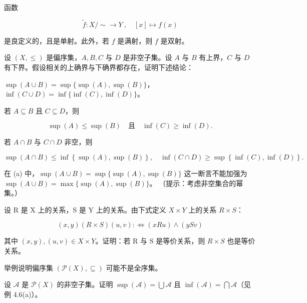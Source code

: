 \begin{exercises}
\begin{items}
\item

函数

\[
\tilde{f}\colon X/{\sim}\to Y~,\quad[x]\mapsto f(x)
\]

是良定义的，且是单射。此外，若 $f$ 是满射，则 $f$ 是双射。

\end{items}

\item

设  $ (X, \leq) $ 是偏序集，$ A, B, C $ 与  $ D $ 是非空子集。设  $ A $ 与  $ B $ 有上界，$ C $ 与  $ D $ 有下界。假设相关的上确界与下确界都存在，证明下述结论：

\begin{items}
\item

$ \sup(A \cup B) = \sup\{\sup(A), \sup(B)\} $，$ \inf(C \cup D) = \inf\{\inf(C), \inf(D)\} $。

\item

若  $ A \subseteq B $ 且  $ C \subseteq D $，则

\[
\sup(A)\leq\sup(B)\quad\text{且}\quad\inf(C)\geq\inf(D).
\]
\item

若  $ A \cap B $ 与  $ C \cap D $ 非空，则

\[
\operatorname*{s u p}(A\cap B)\leq\operatorname*{i n f}\left\{\operatorname*{s u p}(A),\operatorname*{s u p}(B)\right\},\quad\operatorname*{i n f}(C\cap D)\geq\operatorname*{s u p}\left\{\operatorname*{i n f}(C),\operatorname*{i n f}(D)\right\}.
\]
\item

在 (a) 中，$ \sup(A \cup B) = \sup\{\sup(A), \sup(B)\} $ 这一断言不能加强为  $ \sup(A \cup B) = \max\{\sup(A), \sup(B)\} $。
（提示：考虑非空集合的幂集。）

\end{items}

\item

设 R 是 X 上的关系，S 是 Y 上的关系。由下式定义  $ X \times Y $ 上的关系  $ R \times S $：

\[
(x,y)(R\times S)(u,v):\Leftrightarrow(x R u)\land(y S v)
\]

其中  $ (x,y),(u,v)\in X\times Y $。证明：若 R 与 S 是等价关系，则  $ R\times S $ 也是等价关系。

\item

举例说明偏序集  $ \left(\mathcal{P}(X), \subseteq\right) $ 可能不是全序集。

\item

设  $ \mathcal{A} $ 是  $ \mathcal{P}(X) $ 的非空子集。证明  $ \sup(\mathcal{A}) = \bigcup \mathcal{A} $ 且  $ \inf(\mathcal{A}) = \bigcap \mathcal{A} $（见例 4.6(a)）。

\end{exercises}

